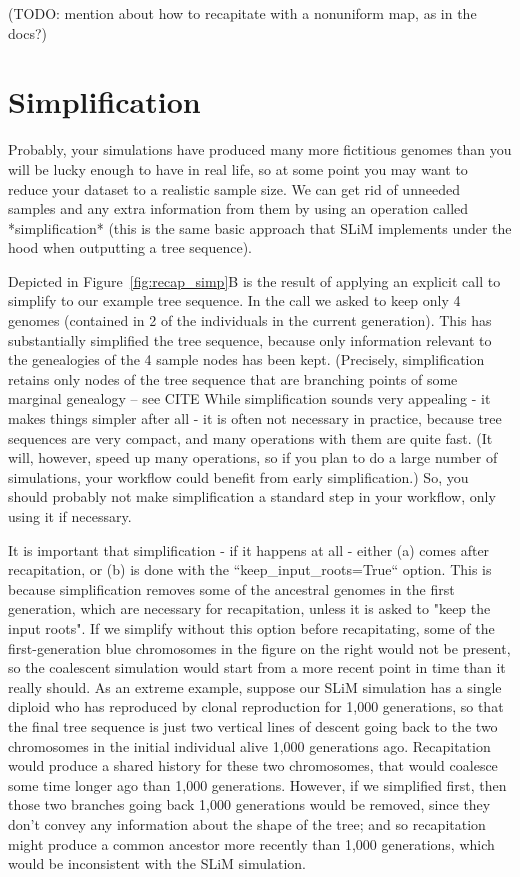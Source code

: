 \documentclass[12pt]{article}
\begin{document}
(TODO: mention about how to recapitate with a nonuniform map, as in the docs?)


\section{Simplification}


Probably, your simulations have produced many more fictitious genomes
than you will be lucky enough to have in real life,
so at some point you may want to reduce your dataset to a realistic sample size.
We can get rid of unneeded samples and any extra information from them by using
an operation called *simplification* (this is the same basic approach that SLiM
implements under the hood when outputting a tree sequence).

Depicted in Figure~\ref{fig:recap_simp}B is the result of applying an explicit call to
simplify to our example tree sequence.
In the call we asked to keep only 4
genomes (contained in 2 of the individuals in the current generation). This has
substantially simplified the tree sequence, because only information relevant to the
genealogies of the 4 sample nodes has been kept. (Precisely, simplification retains only
nodes of the tree sequence that are branching points of some marginal genealogy -- see
CITE %
While simplification sounds very appealing - it makes things simpler after all -
it is often not necessary in practice, because tree sequences are very compact,
and many operations with them are quite fast.
(It will, however, speed up many operations, so if you plan to do a large number of simulations,
your workflow could benefit from early simplification.)
So, you should probably not make simplification a standard step in your workflow,
only using it if necessary.

It is important that simplification - if it happens at all -
either (a) comes after recapitation, or (b) is done with the
``keep\_input\_roots=True`` option.
This is because simplification removes some of the
ancestral genomes in the first generation,
which are necessary for recapitation,
unless it is asked to "keep the input roots".
If we simplify without this option before recapitating,
some of the first-generation blue chromosomes in the figure on the right
would not be present, so the coalescent simulation would start from a more recent point in time
than it really should.
As an extreme example, suppose our SLiM simulation has a single diploid who has reproduced
by clonal reproduction for 1,000 generations,
so that the final tree sequence is just two vertical lines of descent going back
to the two chromosomes in the initial individual alive 1,000 generations ago.
Recapitation would produce a shared history for these two chromosomes,
that would coalesce some time longer ago than 1,000 generations.
However, if we simplified first, then those two branches going back 1,000 generations would be removed,
since they don't convey any information about the shape of the tree;
and so recapitation might produce a common ancestor more recently than 1,000 generations,
which would be inconsistent with the SLiM simulation.
\end{document}
